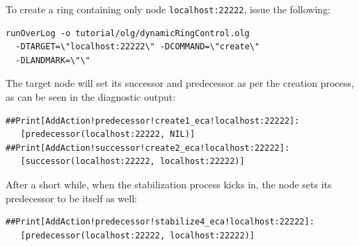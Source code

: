 \documentclass{article}
\begin{document}
To create a ring containing only node 
\lstinline$localhost:22222$, issue the following:
\begin{verbatim}
runOverLog -o tutorial/olg/dynamicRingControl.olg
  -DTARGET=\"localhost:22222\" -DCOMMAND=\"create\"
  -DLANDMARK=\"\"
\end{verbatim}
The target node will set its successor and predecessor as per the
creation process, as can be seen in the diagnostic output:
\begin{verbatim}
##Print[AddAction!predecessor!create1_eca!localhost:22222]:
   [predecessor(localhost:22222, NIL)]
##Print[AddAction!successor!create2_eca!localhost:22222]:
   [successor(localhost:22222, localhost:22222)]
\end{verbatim}
After a short while, when the stabilization process kicks in, the node
sets its predecessor to be itself as well:
\begin{verbatim}
##Print[AddAction!predecessor!stabilize4_eca!localhost:22222]:
   [predecessor(localhost:22222, localhost:22222)]
\end{verbatim}
\end{document}
